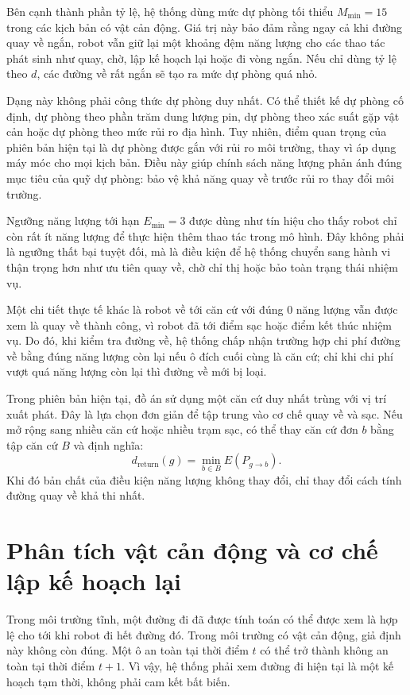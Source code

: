 \documentclass[../DoAn.tex]{subfiles}
\begin{document}
Bên cạnh thành phần tỷ lệ, hệ thống dùng mức dự phòng tối thiểu $M_{\min}=15$ trong các kịch bản có vật cản động. Giá trị này bảo đảm rằng ngay cả khi đường quay về ngắn, robot vẫn giữ lại một khoảng đệm năng lượng cho các thao tác phát sinh như quay, chờ, lập kế hoạch lại hoặc đi vòng ngắn. Nếu chỉ dùng tỷ lệ theo $d$, các đường về rất ngắn sẽ tạo ra mức dự phòng quá nhỏ.

Dạng này không phải công thức dự phòng duy nhất. Có thể thiết kế dự phòng cố định, dự phòng theo phần trăm dung lượng pin, dự phòng theo xác suất gặp vật cản hoặc dự phòng theo mức rủi ro địa hình. Tuy nhiên, điểm quan trọng của phiên bản hiện tại là dự phòng được gắn với rủi ro môi trường, thay vì áp dụng máy móc cho mọi kịch bản. Điều này giúp chính sách năng lượng phản ánh đúng mục tiêu của quỹ dự phòng: bảo vệ khả năng quay về trước rủi ro thay đổi môi trường.

Ngưỡng năng lượng tới hạn $E_{\min}=3$ được dùng như tín hiệu cho thấy robot chỉ còn rất ít năng lượng để thực hiện thêm thao tác trong mô hình. Đây không phải là ngưỡng thất bại tuyệt đối, mà là điều kiện để hệ thống chuyển sang hành vi thận trọng hơn như ưu tiên quay về, chờ chỉ thị hoặc bảo toàn trạng thái nhiệm vụ.

Một chi tiết thực tế khác là robot về tới căn cứ với đúng 0 năng lượng vẫn được xem là quay về thành công, vì robot đã tới điểm sạc hoặc điểm kết thúc nhiệm vụ. Do đó, khi kiểm tra đường về, hệ thống chấp nhận trường hợp chi phí đường về bằng đúng năng lượng còn lại nếu ô đích cuối cùng là căn cứ; chỉ khi chi phí vượt quá năng lượng còn lại thì đường về mới bị loại.

Trong phiên bản hiện tại, đồ án sử dụng một căn cứ duy nhất trùng với vị trí xuất phát. Đây là lựa chọn đơn giản để tập trung vào cơ chế quay về và sạc. Nếu mở rộng sang nhiều căn cứ hoặc nhiều trạm sạc, có thể thay căn cứ đơn $b$ bằng tập căn cứ $B$ và định nghĩa:
\begin{equation}
d_{\text{return}}(g)=\min_{b\in B}E(P_{g\rightarrow b}).
\end{equation}
Khi đó bản chất của điều kiện năng lượng không thay đổi, chỉ thay đổi cách tính đường quay về khả thi nhất.

\section{Phân tích vật cản động và cơ chế lập kế hoạch lại}

Trong môi trường tĩnh, một đường đi đã được tính toán có thể được xem là hợp lệ cho tới khi robot đi hết đường đó. Trong môi trường có vật cản động, giả định này không còn đúng. Một ô an toàn tại thời điểm $t$ có thể trở thành không an toàn tại thời điểm $t+1$. Vì vậy, hệ thống phải xem đường đi hiện tại là một kế hoạch tạm thời, không phải cam kết bất biến.
\end{document}
